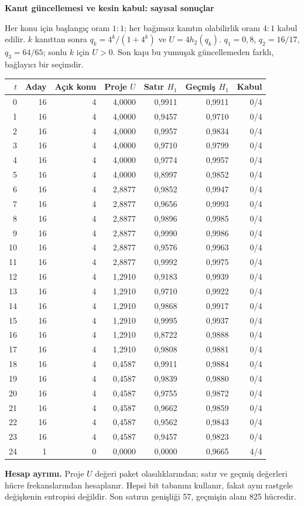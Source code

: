 \documentclass[11pt,a4paper]{article}
\newcommand{\heading}[2]{{\sffamily\small\color{blue!40!black}#1}\par{\sffamily\LARGE\bfseries#2}\par\vspace{3mm}}
\newcommand{\page}[2]{\newpage\heading{#1}{#2}}
\begin{document}
\page{Yöntem 4/5 | Hesap ve izlenebilirlik}{Kanıt güncellemesi ve kesin kabul: sayısal sonuçlar}
Her konu için başlangıç oranı $1:1$; her bağımsız kanıtın olabilirlik oranı $4:1$ kabul edilir. $k$ kanıttan sonra $q_k=4^k/(1+4^k)$ ve $U=4h_2(q_k)$. $q_1=0{,}8$, $q_2=16/17$, $q_3=64/65$; sonlu $k$ için $U>0$. Son kapı bu yumuşak güncellemeden farklı, bağlayıcı bir seçimdir.
\begin{center}\small\begin{tabular}{rrrrrrr}\toprule $t$ & Aday & Açık konu & Proje $U$ & Satır $H_1$ & Geçmiş $H_1$ & Kabul\\\midrule
0 & 16 & 4 & 4,0000 & 0,9911 & 0,9911 & 0/4 \\
1 & 16 & 4 & 4,0000 & 0,9457 & 0,9710 & 0/4 \\
2 & 16 & 4 & 4,0000 & 0,9957 & 0,9834 & 0/4 \\
3 & 16 & 4 & 4,0000 & 0,9710 & 0,9799 & 0/4 \\
4 & 16 & 4 & 4,0000 & 0,9774 & 0,9957 & 0/4 \\
5 & 16 & 4 & 4,0000 & 0,8997 & 0,9852 & 0/4 \\
6 & 16 & 4 & 2,8877 & 0,9852 & 0,9947 & 0/4 \\
7 & 16 & 4 & 2,8877 & 0,9656 & 0,9993 & 0/4 \\
8 & 16 & 4 & 2,8877 & 0,9896 & 0,9985 & 0/4 \\
9 & 16 & 4 & 2,8877 & 0,9990 & 0,9986 & 0/4 \\
10 & 16 & 4 & 2,8877 & 0,9576 & 0,9963 & 0/4 \\
11 & 16 & 4 & 2,8877 & 0,9992 & 0,9975 & 0/4 \\
12 & 16 & 4 & 1,2910 & 0,9183 & 0,9939 & 0/4 \\
13 & 16 & 4 & 1,2910 & 0,9710 & 0,9922 & 0/4 \\
14 & 16 & 4 & 1,2910 & 0,9868 & 0,9917 & 0/4 \\
15 & 16 & 4 & 1,2910 & 0,9995 & 0,9937 & 0/4 \\
16 & 16 & 4 & 1,2910 & 0,8722 & 0,9888 & 0/4 \\
17 & 16 & 4 & 1,2910 & 0,9808 & 0,9881 & 0/4 \\
18 & 16 & 4 & 0,4587 & 0,9911 & 0,9884 & 0/4 \\
19 & 16 & 4 & 0,4587 & 0,9839 & 0,9880 & 0/4 \\
20 & 16 & 4 & 0,4587 & 0,9755 & 0,9872 & 0/4 \\
21 & 16 & 4 & 0,4587 & 0,9662 & 0,9859 & 0/4 \\
22 & 16 & 4 & 0,4587 & 0,9562 & 0,9843 & 0/4 \\
23 & 16 & 4 & 0,4587 & 0,9457 & 0,9823 & 0/4 \\
24 & 1 & 0 & 0,0000 & 0,0000 & 0,9665 & 4/4 \\
\bottomrule\end{tabular}\end{center}
\textbf{Hesap ayrımı.} Proje $U$ değeri paket olasılıklarından; satır ve geçmiş değerleri hücre frekanslarından hesaplanır. Hepsi bit tabanını kullanır, fakat aynı rastgele değişkenin entropisi değildir. Son satırın genişliği 57, geçmişin alanı 825 hücredir.
\end{document}
